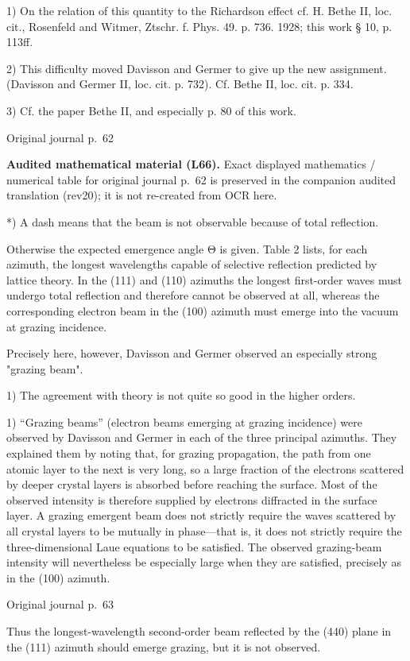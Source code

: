\documentclass[10pt]{article}
\newcommand{\origpage}[1]{\par\medskip\noindent\hfill{\small\color{notegray}Original journal p.~#1}\hfill\mbox{}\par\smallskip}
\newcommand{\mathref}[2]{\par\smallskip\noindent\colorbox{gray!8}{\parbox{0.95\linewidth}{\small\color{notegray}\textbf{Audited mathematical material (L#1).} Exact displayed mathematics / numerical table for original journal p.~#2 is preserved in the companion audited translation (rev20); it is not re-created from OCR here.}}\par\smallskip}
\begin{document}
\noindent\footnotesize 1) On the relation of this quantity to the Richardson effect cf. H. Bethe II, loc. cit., Rosenfeld and Witmer, Ztschr. f. Phys. 49. p. 736. 1928; this work § 10, p. 113ff.\par\normalsize
\noindent\footnotesize 2) This difficulty moved Davisson and Germer to give up the new assignment. (Davisson and Germer II, loc. cit. p. 732). Cf. Bethe II, loc. cit. p. 334.\par\normalsize
\noindent\footnotesize 3) Cf. the paper Bethe II, and especially p. 80 of this work.\par\normalsize
\origpage{62}
\mathref{66}{62}
*) A dash means that the beam is not observable because of total reflection.\par
Otherwise the expected emergence angle Θ is given. Table 2 lists, for each azimuth, the longest wavelengths capable of selective reflection predicted by lattice theory. In the (111) and (110) azimuths the longest first-order waves must undergo total reflection and therefore cannot be observed at all, whereas the corresponding electron beam in the (100) azimuth must emerge into the vacuum at grazing incidence.\par
Precisely here, however, Davisson and Germer observed an especially strong "grazing beam".\par
\noindent\footnotesize 1) The agreement with theory is not quite so good in the higher orders.\par\normalsize
\noindent\footnotesize 1) “Grazing beams” (electron beams emerging at grazing incidence) were observed by Davisson and Germer in each of the three principal azimuths. They explained them by noting that, for grazing propagation, the path from one atomic layer to the next is very long, so a large fraction of the electrons scattered by deeper crystal layers is absorbed before reaching the surface. Most of the observed intensity is therefore supplied by electrons diffracted in the surface layer. A grazing emergent beam does not strictly require the waves scattered by all crystal layers to be mutually in phase—that is, it does not strictly require the three-dimensional Laue equations to be satisfied. The observed grazing-beam intensity will nevertheless be especially large when they are satisfied, precisely as in the (100) azimuth.\par\normalsize
\origpage{63}
Thus the longest-wavelength second-order beam reflected by the (440) plane in the (111) azimuth should emerge grazing, but it is not observed.\par
\end{document}
